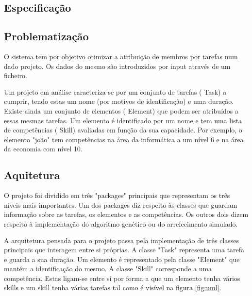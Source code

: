 \begin{titlepage}

\newpage %


\section{Especificação}

\subsection{Problematização}
\justify\normalsize
O sistema tem por objetivo otimizar a atribuição de membros por tarefas num dado projeto. Os dados do mesmo são introduzidos por input através de um ficheiro.

Um projeto em análise caracteriza-se por um conjunto de tarefas ( Task) a cumprir, tendo estas um nome (por motivos de identificação) e uma duração. Existe ainda um conjunto de elementos ( Element) que podem ser atribuídos a essas mesmas tarefas. Um elemento é identificado por um nome e tem uma lista de competências ( Skill) avaliadas em função da sua capacidade. Por exemplo, o elemento "joão" tem competências na área da informática a um nível 6 e na área da economia com nível 10.

\subsection{Aquitetura}
\justify\normalsize
O projeto foi dividido em três "packages" principais que representam os três níveis mais importantes. Um dos packages diz respeito às classes que guardam informação sobre as tarefas, os elementos e as competências. Os outros dois dizem respeito à implementação do algoritmo genético ou do arrefecimento simulado.

A arquitetura pensada para o projeto passa pela implementação de três classes principais que interagem entre si próprias. A classe "Task" representa uma tarefa e guarda a sua duração. Um elemento é representado pela classe "Element" que mantém a identificação do mesmo. A classe "Skill" corresponde a uma competência. Estas ligam-se entre si por forma a que um elemento tenha vários skills e um skill tenha várias tarefas tal como é visível na figura \ref{fig:uml}.


\end{titlepage}
